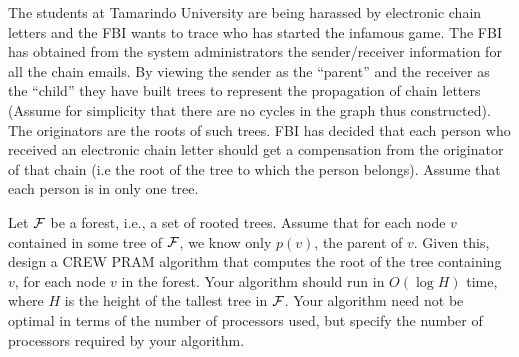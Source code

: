 The students at Tamarindo University are being harassed by electronic
chain letters and the FBI wants to trace who has started the infamous
game.  The FBI has obtained from the system administrators the
sender/receiver information for all the chain emails.  By viewing the
sender as the ``parent'' and the receiver as the ``child'' they have
built trees to represent the propagation of chain letters (Assume for
simplicity that there are no cycles in the graph thus
constructed). The originators are the roots of such trees. FBI has
decided that each person who received an electronic chain letter
should get a compensation from the originator of that chain (i.e the
root of the tree to which the person belongs). Assume that each person
is in only one tree.

Let $\cal  F$ be a forest, i.e., a set of rooted trees.  Assume that
for each node $v$ contained in some tree of $\cal  F$, we know only
$p(v)$, the parent of $v$.  Given this, design a CREW PRAM algorithm
that computes the root of the tree containing $v$, for each node $v$
in the forest.  Your algorithm should run in $O(\log  H)$ time, where
$H$ is the height of the tallest tree in $\cal  F$.  Your algorithm
need not be optimal in terms of the number of processors used, but
specify the number of processors required by your algorithm.
